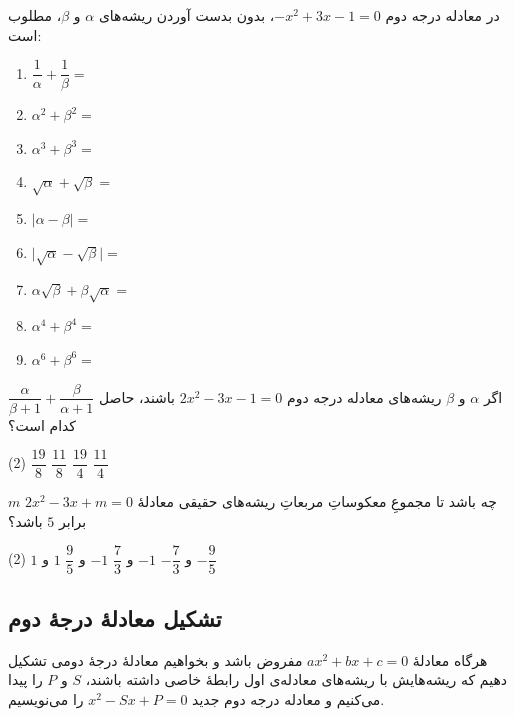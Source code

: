 \begin{example}
در معادله درجه دوم
\(-x^2+3x-1=0\)،
بدون بدست آوردن ریشه‌های \(\alpha\) و \(\beta\)، مطلوب است:
\begin{LTR}    
\begin{enumerate}
    \item \(\dfrac{1}{\alpha}+\dfrac{1}{\beta}=\)
    \item \(\alpha^2+\beta^2=\)
    \item \(\alpha^3+\beta^3=\)
    \item \(\sqrt{\alpha}+\sqrt{\beta}=\)
    \item \(\lvert\alpha-\beta\rvert=\)
    \item \(\lvert\sqrt{\alpha}-\sqrt{\beta}\rvert=\)
    \item \(\alpha\sqrt{\beta}+\beta\sqrt{\alpha}=\)
    \item \(\alpha^4+\beta^4=\)
    \item \(\alpha^6+\beta^6=\)
\end{enumerate}
\end{LTR}
\end{example}

\begin{example}
اگر \(\alpha\) و \(\beta\) ریشه‌های معادله درجه دوم
\(2x^2-3x-1=0\) باشند، حاصل
\(\dfrac{\alpha}{\beta+1}+
\dfrac{\beta}{\alpha+1}\)
کدام است؟

\begin{tasks}(2)
    \task \(\dfrac{19}{8}\)
    \task \(\dfrac{11}{8}\)
    \task \(\dfrac{19}{4}\)
    \task \(\dfrac{11}{4}\)
\end{tasks}
\end{example}

\begin{example}
\(m\) چه باشد تا مجموعِ معکوساتِ مربعاتِ ریشه‌های حقیقی
معادلۀ \(2x^2-3x+m=0\) برابر \(5\) باشد؟

\begin{tasks}(2)
    \task \(1\) و \(-\dfrac{7}{3}\)
    \task \(-1\) و \(\dfrac{7}{3}\)
    \task \(-1\) و \(\dfrac{9}{5}\)
    \task \(1\) و \(-\dfrac{9}{5}\)
\end{tasks}
\end{example}

\subsection{تشکیل معادلۀ درجۀ دوم}

هرگاه معادلۀ \(ax^2+bx+c=0\) مفروض باشد و بخواهیم
معادلۀ درجۀ دومی تشکیل دهیم که ریشه‌هایش با ریشه‌های
معادله‌ی اول رابطۀ خاصی داشته باشند، \(S\) و \(P\) را
پیدا می‌کنیم و معادله درجه دوم جدید
$x^2-Sx+P=0$
را می‌نویسیم.

